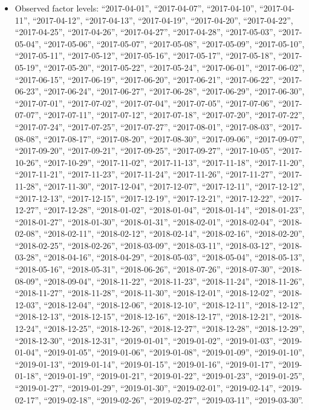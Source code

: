 \documentclass[
  letterpaper,
  DIV=11,
  numbers=noendperiod]{scrartcl}
\providecommand{\tightlist}{%
  \setlength{\itemsep}{0pt}\setlength{\parskip}{0pt}}
\begin{document}
\begin{itemize}
\tightlist
\item
  Observed factor levels: ``2017-04-01'', ``2017-04-07'',
  ``2017-04-10'', ``2017-04-11'', ``2017-04-12'', ``2017-04-13'',
  ``2017-04-19'', ``2017-04-20'', ``2017-04-22'', ``2017-04-25'',
  ``2017-04-26'', ``2017-04-27'', ``2017-04-28'', ``2017-05-03'',
  ``2017-05-04'', ``2017-05-06'', ``2017-05-07'', ``2017-05-08'',
  ``2017-05-09'', ``2017-05-10'', ``2017-05-11'', ``2017-05-12'',
  ``2017-05-16'', ``2017-05-17'', ``2017-05-18'', ``2017-05-19'',
  ``2017-05-20'', ``2017-05-22'', ``2017-05-24'', ``2017-06-01'',
  ``2017-06-02'', ``2017-06-15'', ``2017-06-19'', ``2017-06-20'',
  ``2017-06-21'', ``2017-06-22'', ``2017-06-23'', ``2017-06-24'',
  ``2017-06-27'', ``2017-06-28'', ``2017-06-29'', ``2017-06-30'',
  ``2017-07-01'', ``2017-07-02'', ``2017-07-04'', ``2017-07-05'',
  ``2017-07-06'', ``2017-07-07'', ``2017-07-11'', ``2017-07-12'',
  ``2017-07-18'', ``2017-07-20'', ``2017-07-22'', ``2017-07-24'',
  ``2017-07-25'', ``2017-07-27'', ``2017-08-01'', ``2017-08-03'',
  ``2017-08-08'', ``2017-08-17'', ``2017-08-20'', ``2017-08-30'',
  ``2017-09-06'', ``2017-09-07'', ``2017-09-20'', ``2017-09-21'',
  ``2017-09-25'', ``2017-09-27'', ``2017-10-05'', ``2017-10-26'',
  ``2017-10-29'', ``2017-11-02'', ``2017-11-13'', ``2017-11-18'',
  ``2017-11-20'', ``2017-11-21'', ``2017-11-23'', ``2017-11-24'',
  ``2017-11-26'', ``2017-11-27'', ``2017-11-28'', ``2017-11-30'',
  ``2017-12-04'', ``2017-12-07'', ``2017-12-11'', ``2017-12-12'',
  ``2017-12-13'', ``2017-12-15'', ``2017-12-19'', ``2017-12-21'',
  ``2017-12-22'', ``2017-12-27'', ``2017-12-28'', ``2018-01-02'',
  ``2018-01-04'', ``2018-01-14'', ``2018-01-23'', ``2018-01-27'',
  ``2018-01-30'', ``2018-01-31'', ``2018-02-01'', ``2018-02-04'',
  ``2018-02-08'', ``2018-02-11'', ``2018-02-12'', ``2018-02-14'',
  ``2018-02-16'', ``2018-02-20'', ``2018-02-25'', ``2018-02-26'',
  ``2018-03-09'', ``2018-03-11'', ``2018-03-12'', ``2018-03-28'',
  ``2018-04-16'', ``2018-04-29'', ``2018-05-03'', ``2018-05-04'',
  ``2018-05-13'', ``2018-05-16'', ``2018-05-31'', ``2018-06-26'',
  ``2018-07-26'', ``2018-07-30'', ``2018-08-09'', ``2018-09-04'',
  ``2018-11-22'', ``2018-11-23'', ``2018-11-24'', ``2018-11-26'',
  ``2018-11-27'', ``2018-11-28'', ``2018-11-30'', ``2018-12-01'',
  ``2018-12-02'', ``2018-12-03'', ``2018-12-04'', ``2018-12-06'',
  ``2018-12-10'', ``2018-12-11'', ``2018-12-12'', ``2018-12-13'',
  ``2018-12-15'', ``2018-12-16'', ``2018-12-17'', ``2018-12-21'',
  ``2018-12-24'', ``2018-12-25'', ``2018-12-26'', ``2018-12-27'',
  ``2018-12-28'', ``2018-12-29'', ``2018-12-30'', ``2018-12-31'',
  ``2019-01-01'', ``2019-01-02'', ``2019-01-03'', ``2019-01-04'',
  ``2019-01-05'', ``2019-01-06'', ``2019-01-08'', ``2019-01-09'',
  ``2019-01-10'', ``2019-01-13'', ``2019-01-14'', ``2019-01-15'',
  ``2019-01-16'', ``2019-01-17'', ``2019-01-18'', ``2019-01-19'',
  ``2019-01-21'', ``2019-01-22'', ``2019-01-23'', ``2019-01-25'',
  ``2019-01-27'', ``2019-01-29'', ``2019-01-30'', ``2019-02-01'',
  ``2019-02-14'', ``2019-02-17'', ``2019-02-18'', ``2019-02-26'',
  ``2019-02-27'', ``2019-03-11'', ``2019-03-30''.
\end{itemize}
\end{document}
